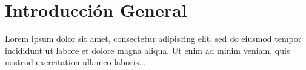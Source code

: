\part*{Introducción General}

Lorem ipsum dolor sit amet, consectetur adipiscing elit, sed do 
eiusmod tempor incididunt ut labore et dolore magna aliqua. Ut 
enim ad minim veniam, quis nostrud exercitation ullamco laboris...